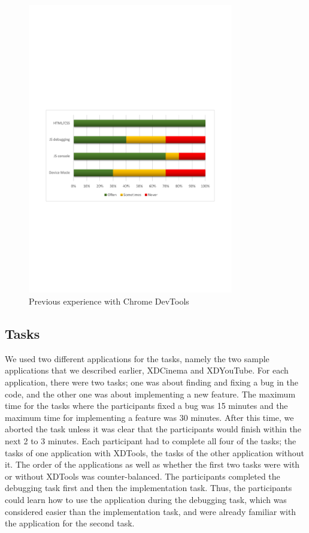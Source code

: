 \begin{figure}[H]
  \centering
    \includegraphics[width=0.8\textwidth]{images/charts/devtools_xp.pdf}
	\caption[Previous experience with Chrome DevTools]{Previous experience with Chrome DevTools}
	\label{fig:devtools_xp}
\end{figure}

\subsection{Tasks}

We used two different applications for the tasks, namely the two sample applications that we described earlier, XDCinema and XDYouTube. For each application, there were two tasks; one was about finding and fixing a bug in the code, and the other one was about implementing a new feature. The maximum time for the tasks where the participants fixed a bug was 15 minutes and the maximum time for implementing a feature was 30 minutes. After this time, we aborted the task unless it was clear that the participants would finish within the next 2 to 3 minutes. Each participant had to complete all four of the tasks; the tasks of one application with XDTools, the tasks of the other application without it. The order of the applications as well as whether the first two tasks were with or without XDTools was counter-balanced. The participants completed the debugging task first and then the implementation task. Thus, the participants could learn how to use the application during the debugging task, which was considered easier than the implementation task, and were already familiar with the application for the second task.

